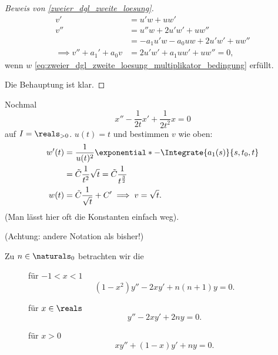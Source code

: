 \begin{proof}[Beweis von \ref{zweier_dgl_zweite_loesung}]
  \begin{align*}
    v'&=u'w+uw'\\
    v''&=u''w+2u'w'+uw''\\
    &=-a_1u'w-a_0uw+2u'w'+uw''\\
    \implies v''+a_1'+a_0v&=2u'w'+a_1uw'+uw''=0,
  \end{align*}
  wenn \( w \) \eqref{eq:zweier_dgl_zweite_loesung_multiplikator_bedingung} erfüllt.

  Die  Behauptung ist klar.
\end{proof}
\begin{beispiel*}
  Nochmal
  \begin{equation*}
    x''-\frac{1}{2t}x'+\frac{1}{2t^2}x=0
  \end{equation*}
auf \( I=\reals_{>0} \). \( u(t)=t \) und bestimmen \( v \) wie oben:
\begin{align*}
  w'(t)&=\frac{1}{u(t)^2}\exponential*{-\Integrate{a_1(s)}{s,t_0,t}}\\
  &=\tilde{C}\frac{1}{t^2}\sqrt{t}=\tilde{C}\frac{1}{t^{\frac{3}{2}}}\\
  w(t)&=\tilde{C}\frac{1}{\sqrt{t}}+C'\implies v=\sqrt{t}.
\end{align*}
(Man lässt hier oft die Konstanten einfach weg).
\end{beispiel*}
\begin{blank}[Besondere DGL'n mit \( k=2 \), \( n=1 \)]\label{besondere_dlgs}
  (Achtung: andere Notation als bisher!)

  Zu \( n\in \naturals_0 \) betrachten wir die 
  \begin{description}
    \item[] für \( -1<x<1 \)
    \begin{equation*}
      (1-x^2)y''-2xy'+n(n+1)y=0.
    \end{equation*}
    \item[] für \( x\in \reals \)
    \begin{equation*}
      y''-2xy'+2ny=0.
    \end{equation*}
    \item[] für \( x>0 \)
    \begin{equation*}
      xy''+(1-x)y'+ny=0.
    \end{equation*}
  \end{description}
\end{blank}
